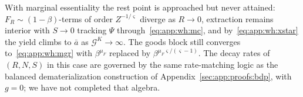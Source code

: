  With marginal essentiality the rest point is approached but never attained: $F_R\sim\left(1-\beta\right)$-terms of order $Z^{-1/\varsigma}$ diverge as $R\to0$, extraction remains interior with $S\to0$ tracking $\Psi$ through~\eqref{eq:app:wh:mc}, and by~\eqref{eq:app:wh:xstar} the yield climbs to $\bar a$ as $\mathcal G^K\to\infty$. The goods block still converges to~\eqref{eq:app:wh:mgr} with $\beta^{\mu_F}$ replaced by $\beta^{\mu_F\varsigma/\left(\varsigma-1\right)}$. The decay rates of $\left(R,N,S\right)$ in this case are governed by the same rate-matching logic as the balanced dematerialization construction of Appendix~\ref{sec:app:proofs:bdp}, with $g=0$; we have not completed that algebra.
